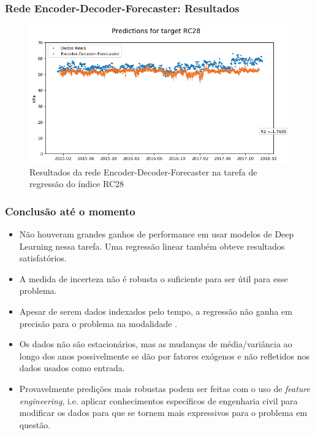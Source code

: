 \documentclass{beamer}
\begin{document}
\begin{frame}
\frametitle{Rede Encoder-Decoder-Forecaster: Resultados}  
\begin{figure}[H]
\centering
\includegraphics[width=0.9\columnwidth]{exped_saco_2008-2015-2017encdecRC28.png}
\caption{Resultados da rede Encoder-Decoder-Forecaster na tarefa de regressão do índice RC28}
\label{fig:3nseq}
\end{figure}
\end{frame}

\begin{frame}
  \frametitle{Conclusão até o momento}
  \begin{itemize}
    \item Não houveram grandes ganhos de performance em usar modelos de Deep
      Learning nessa tarefa. Uma regressão linear também obteve
      resultados satisfatórios.
    \item A medida de incerteza não é robusta o suficiente para ser útil para
      esse problema.
      \item Apesar de serem dados indexados pelo tempo, a regressão não ganha em
        precisão para o problema na modalidade . 
      \item Os dados não são estacionários, mas as mudanças de média/variância
        ao longo dos anos possivelmente se dão por fatores exógenos e não
        refletidos nos dados usados como entrada.
      \item Provavelmente predições mais robustas podem ser feitas com o uso de
        \textit{feature engineering}, i.e. aplicar conhecimentos específicos de
        engenharia civil para modificar os dados para que se tornem mais
        expressivos para o problema em questão.
      \end{itemize} 
      
\end{frame}
\end{document}
